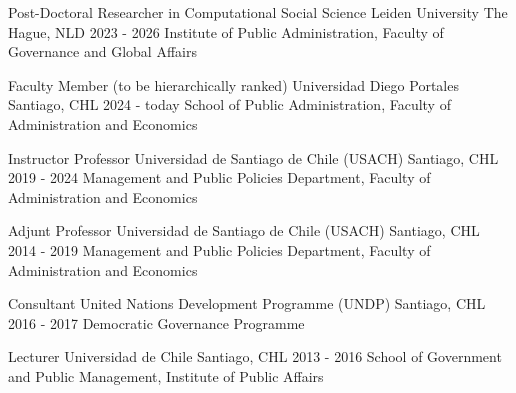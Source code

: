 





\begin{cventries}
\cventry
{Post-Doctoral Researcher in Computational Social Science} 
{Leiden University} 
{The Hague, NLD} 
{2023 - 2026}
{Institute of Public Administration, Faculty of Governance and Global Affairs} \vspace{1.5mm}

\cventry
{Faculty Member (to be hierarchically ranked)} 
{Universidad Diego Portales} 
{Santiago, CHL} 
{2024 - today}
{School of Public Administration, Faculty of Administration and Economics} \vspace{1.5mm}


\cventry
{Instructor Professor} 
{Universidad de Santiago de Chile (USACH)} 
{Santiago, CHL} 
{2019 - 2024}
{Management and Public Policies Department, Faculty of Administration and Economics} \vspace{1.5mm}
\end{cventries}

\begin{cventries}
\cventry
{Adjunt Professor} 
{Universidad de Santiago de Chile (USACH)} 
{Santiago, CHL} 
{2014 - 2019}
{Management and Public Policies Department, Faculty of Administration and Economics} \vspace{1.5mm}

\cventry
{Consultant} 
{United Nations Development Programme (UNDP)} 
{Santiago, CHL} 
{2016 - 2017}
{Democratic Governance Programme} \vspace{1.5mm}

\cventry
{Lecturer} 
{Universidad de Chile} 
{Santiago, CHL} 
{2013 - 2016}
{School of Government and Public Management, Institute of Public Affairs}\vspace{1.5mm}
\end{cventries}
